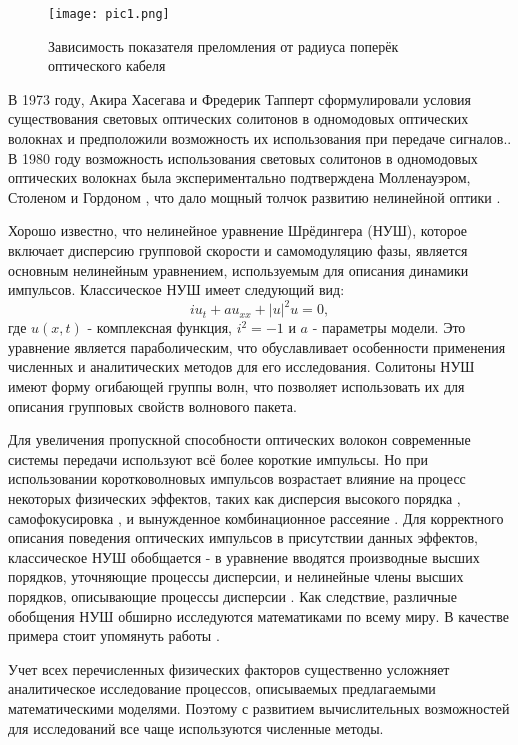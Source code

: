 \documentclass[14pt,a4paper]{extreport}
\begin{document}
			\begin{figure}[h!]
				\center
				\texttt{[image: pic1.png]}
				\caption{Зависимость показателя преломления от радиуса поперёк оптического кабеля\cite{Rad2}}
			\end{figure}

			В 1973 году, Акира Хасегава и Фредерик Тапперт сформулировали условия существования световых оптических солитонов в одномодовых оптических волокнах и предположили возможность их использования при передаче сигналов.\cite{Rad19,Hasegawa1973}. В 1980 году возможность использования световых солитонов в одномодовых оптических волокнах была экспериментально подтверждена Молленауэром, Столеном и Гордоном \cite{Rad01,Rad02}, что дало мощный толчок развитию нелинейной оптики \cite{Rad14,Rad15,Rad16,Rad03}.

			Хорошо известно, что нелинейное уравнение Шрёдингера (НУШ), которое включает дисперсию групповой скорости и самомодуляцию фазы, является основным нелинейным уравнением, используемым для описания динамики импульсов. Классическое НУШ имеет следующий вид:
			\begin{equation}\label{eq1}
				iu_{t}+a u_{xx}+|u|^2 u=0,
			\end{equation}
			где \(u(x,t)\) - комплексная функция, \(i^{2}=-1\) и \(a\) - параметры модели. Это уравнение является параболическим, что обуславливает особенности применения численных и аналитических методов для его исследования. Солитоны НУШ имеют форму огибающей группы волн, что позволяет использовать их для описания групповых свойств волнового пакета.

			Для увеличения пропускной способности оптических волокон современные системы передачи используют всё более короткие импульсы. Но при использовании коротковолновых импульсов возрастает влияние на процесс некоторых физических эффектов, таких как дисперсия высокого порядка \cite{Rad5,Rad8,Rad020,Rad014,Rad016}, самофокусировка \cite{UZUNOV2022170137}, и вынужденное комбинационное рассеяние \cite{WANG2022120667,GROMOV201488}. Для корректного описания поведения оптических импульсов в присутствии данных эффектов, классическое НУШ обобщается - в уравнение вводятся производные высших порядков, уточняющие процессы дисперсии, и нелинейные члены высших порядков, описывающие процессы дисперсии \cite{Rad9,Rad015,Rad017,Rad018,Rad019}. Как следствие, различные обобщения НУШ обширно исследуются математиками по всему миру. В качестве примера стоит упомянуть работы \cite{Rad10,Rad11,Rad17,Rad18}. 

			Учет всех перечисленных физических факторов существенно усложняет аналитическое исследование процессов, описываемых предлагаемыми математическими моделями. Поэтому с развитием вычислительных возможностей для исследований все чаще используются численные методы.
\end{document}
